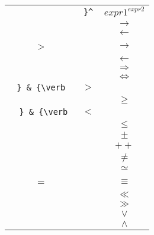 \documentclass[12pt]{amsart}
\begin{document}
\begin{longtable}{|c|c|c|}
{    \\
    \hline
    {\verb **  } & {\verb {}^{} } & ${expr1}^{expr2}$
    \\
    \hline
    {\verb -> } & {\verb \to } & ${\to}$
    \\
    \hline
    {\verb <- } & {\verb \gets } & ${\gets}$
    \\
    \hline
    {\verb --> } & {\verb \longrightarrow } & ${\longrightarrow}$
    \\
    \hline
    {\verb <-- } & {\verb \longleftarrow } & ${\longleftarrow}$
    \\
    \hline
    {\verb => } & {\verb \Rightarrow } & ${\Rightarrow}$
    \\
    \hline
    {\verb <=> } & {\verb \Leftrightarrow } & ${\Leftrightarrow}$
    \\
    \hline
    {\verb > } & {\verb > } & ${>}$
    \\
    \hline
    {\verb >=  } & {\verb \geqslant } & $\geqslant$
    \\
    \hline
    {\verb <  } & {\verb < } & $<$
    \\
    \hline
    {\verb <=  } & {\verb \leqslant } & $\leqslant$
    \\
    \hline
    {\verb +-  } & {\verb \pm } & $\pm$
    \\
    \hline
    {\verb ++  } & {\verb ++ } & $++$
    \\
    \hline
    {\verb !=  } & {\verb \neq } & $\neq$
    \\
    \hline
    {\verb ~=  } & {\verb \simeq } & $\simeq$
    \\
    \hline
    {\verb ===  } & {\verb \equiv } & $\equiv$
    \\
    \hline
    {\verb <<  } & {\verb \ll } & $\ll$
    \\
    \hline
    {\verb >>  } & {\verb \gg } & $\gg$
    \\
    \hline
    {\verb \/  } & {\verb \lor } & $\lor$
    \\
    \hline
    {\verb /\  } & {\verb \land } & $\land$
    \\
    \hline
    \hline
\end{longtable}
\end{document}
